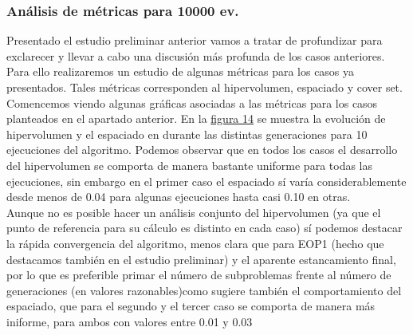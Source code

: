 \subsubsection{Análisis de métricas para 10000 ev.}

Presentado el estudio preliminar anterior vamos a tratar de profundizar para exclarecer y llevar a cabo una discusión más profunda de los casos anteriores. Para ello realizaremos un estudio de algunas métricas para los casos ya presentados. Tales métricas corresponden al hipervolumen, espaciado y cover set.\\

Comencemos viendo algunas gráficas asociadas a las métricas para los casos planteados en el apartado anterior. En la \hyperref[fig:14]{figura 14} se muestra la evolución de hipervolumen y el espaciado en durante las distintas generaciones para 10 ejecuciones del algoritmo. Podemos observar que en todos los casos  el desarrollo del hipervolumen se comporta de manera bastante uniforme para todas las ejecuciones, sin embargo en el primer caso el espaciado sí varía considerablemente desde menos de 0.04 para algunas ejecuciones hasta casi 0.10 en otras.\\

Aunque no es posible hacer un análisis conjunto del hipervolumen (ya que el punto de referencia para su cálculo es distinto en cada caso) sí podemos destacar la rápida convergencia del algoritmo, menos clara que para EOP1 (hecho que destacamos también en el estudio preliminar) y el aparente estancamiento final, por lo que es preferible primar el número de subproblemas frente al número de generaciones (en valores razonables)como sugiere también el comportamiento del espaciado, que para el segundo y el tercer caso se comporta de manera más iniforme, para ambos con valores entre 0.01 y 0.03\\


